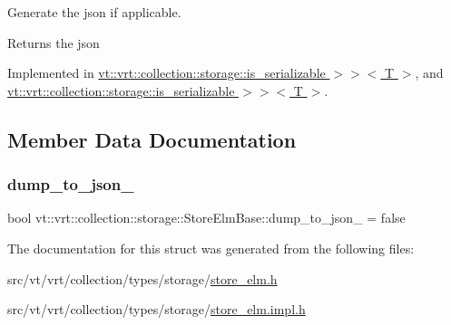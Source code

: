 Generate the json if applicable. 

\begin{DoxyReturn}{Returns}
the json 
\end{DoxyReturn}


Implemented in \hyperlink{structvt_1_1vrt_1_1collection_1_1storage_1_1_store_elm_3_01_t_00_01typename_01std_1_1enable__if_f645d7011e081ebef1092328b0917bfc_aea4bf3c797fb58b2e53fcbf6010c31d1}{vt\+::vrt\+::collection\+::storage\+::is\+\_\+serializable $>$$>$$<$ T $>$}, and \hyperlink{structvt_1_1vrt_1_1collection_1_1storage_1_1_store_elm_3_01_t_00_01typename_01std_1_1enable__if_947e0655769addb625fb511f777768bd_aea4bf3c797fb58b2e53fcbf6010c31d1}{vt\+::vrt\+::collection\+::storage\+::is\+\_\+serializable $>$$>$$<$ T $>$}.



\subsection{Member Data Documentation}
\mbox{\label{structvt_1_1vrt_1_1collection_1_1storage_1_1_store_elm_base_a7bd87e77194a384ecb0a7450d9e7a24a}} 
\subsubsection{\texorpdfstring{dump\+\_\+to\+\_\+json\+\_\+}{dump\_to\_json\_}}
{\footnotesize\ttfamily bool vt\+::vrt\+::collection\+::storage\+::\+Store\+Elm\+Base\+::dump\+\_\+to\+\_\+json\+\_\+ = false\hspace{0.3cm}{\ttfamily [protected]}}



The documentation for this struct was generated from the following files\+:\begin{DoxyCompactItemize}
\item 
src/vt/vrt/collection/types/storage/\hyperlink{store__elm_8h}{store\+\_\+elm.\+h}\item 
src/vt/vrt/collection/types/storage/\hyperlink{store__elm_8impl_8h}{store\+\_\+elm.\+impl.\+h}\end{DoxyCompactItemize}

